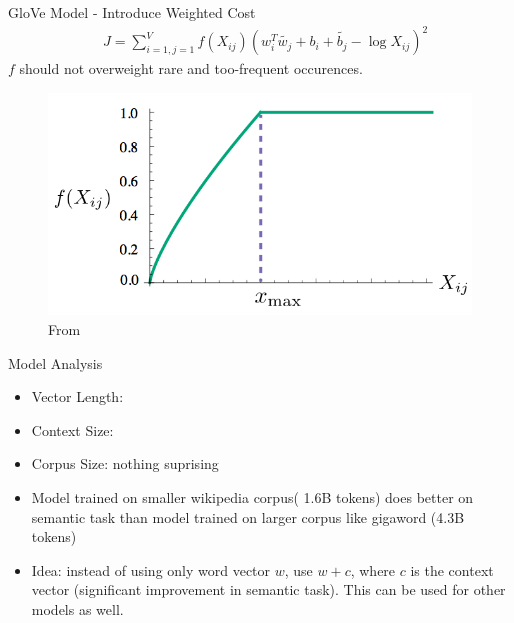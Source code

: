 \begin{frame}{GloVe Model - Introduce Weighted Cost}
  \begin{align*}
    & J = \sum_{i=1,j=1}^V f(X_{ij}) \left( w_i^T\tilde{w_j} +b_i + \tilde{b_j} - \log X_{ij} \right)^2
  \end{align*}
  $f$ should not overweight rare and too-frequent occurences.
  \begin{figure}
    \includegraphics[scale=0.27]{images/weighting.png}
    \caption{From}
  \end{figure}
\end{frame}


\begin{frame}{Model Analysis}
  \begin{itemize}
  \item Vector Length:
  \item Context Size: 
  \item Corpus Size: nothing suprising
  \item Model trained on smaller wikipedia corpus( 1.6B tokens) does better on semantic task than model trained on larger corpus like gigaword (4.3B tokens)
  \item Idea: instead of using only word vector $w$, use $w+c$, where $c$ is the context vector (significant improvement in semantic task). This can be used for other models as well.
  \end{itemize}
\end{frame}


